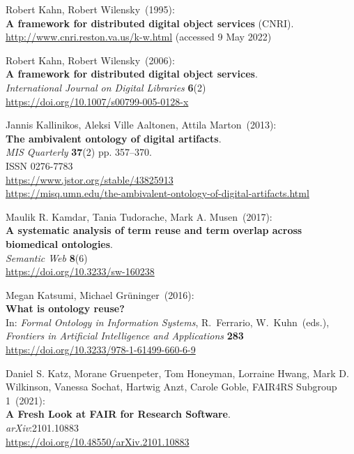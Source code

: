 \begin{thebibliography}{9}
Robert Kahn, Robert Wilensky~(1995): \\
\textbf{A framework for distributed digital object services} (CNRI).\\
\url{http://www.cnri.reston.va.us/k-w.html} (accessed 9 May 2022)


Robert Kahn, Robert Wilensky~(2006): \\
\textbf{A framework for distributed digital object services}.\\
\emph{International Journal on Digital Libraries} \textbf{6}(2)\\
\url{https://doi.org/10.1007/s00799-005-0128-x}

Jannis Kallinikos, Aleksi Ville Aaltonen, Attila Marton~(2013): \\
\textbf{The ambivalent ontology of digital artifacts}.\\ 
\emph{MIS Quarterly} \textbf{37}(2) pp. 357--370.\\
ISSN 0276-7783\\
\url{https://www.jstor.org/stable/43825913}\\
\url{https://misq.umn.edu/the-ambivalent-ontology-of-digital-artifacts.html}

Maulik R. Kamdar, Tania Tudorache, Mark A. Musen~(2017): \\
\textbf{A systematic analysis of term reuse and term overlap across biomedical ontologies}. \\
\emph{Semantic Web} \textbf{8}(6) \\
\url{https://doi.org/10.3233/sw-160238}

Megan Katsumi, Michael Grüninger~(2016): \\
\textbf{What is ontology reuse?}\\
In: \emph{Formal Ontology in Information Systems}, R.~Ferrario, 
W.~Kuhn~(eds.),\\
\emph{Frontiers in Artificial Intelligence and Applications}
\textbf{283}\\
\url{https://doi.org/10.3233/978-1-61499-660-6-9}

Daniel S. Katz, Morane Gruenpeter, Tom Honeyman, Lorraine Hwang, Mark D. Wilkinson, Vanessa Sochat, Hartwig Anzt, Carole Goble, FAIR4RS Subgroup 1~(2021): \\
\textbf{A Fresh Look at FAIR for Research Software}.\\
\emph{arXiv}:2101.10883\\
\url{https://doi.org/10.48550/arXiv.2101.10883}


\end{thebibliography}
